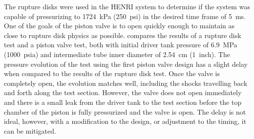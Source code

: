 The rupture disks were used in the HENRI system to determine if the system was capable of pressurizing to \SI{1724}{\kilo\pascal} (\SI{250}{psi}) in the desired time frame of \SI{5}{\milli\second}\cite{HeNURETH}. One of the goals of the piston valve is to open quickly enough to maintain as close to rupture disk physics as possible. 
 compares the results of a rupture disk test and a piston valve test, both with initial driver tank pressure of \SI{6.9}{\mega\pascal} (\SI{1000}{psia}) and intermediate tube inner diameter of \SI{2.54}{\centi\meter} (\SI{1}{inch}). The pressure evolution of the test using the first piston valve design has a slight delay when compared to the results of the rupture disk test. Once the valve is completely open, the evolution matches well, including the shocks travelling back and forth along the test section. However, the valve does not open immediately and there is a small leak from the driver tank to the test section before the top chamber of the piston is fully pressurized and the valve is open. The delay is not ideal, however, with a modification to the design, or adjustment to the timing, it can be mitigated.










